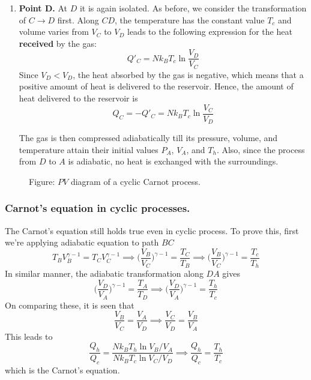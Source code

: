 \documentclass[../../../Main.tex]{subfiles}
\begin{document}
\begin{enumerate}
    \item \textbf{Point D.} At $ D$ it is again isolated. As before, we consider the transformation of $C\rightarrow D$ first. Along $CD$, the temperature has the constant value $T_c$ and volume varies from $V_C$ to $V_D$ leads to the following expression for the heat \textbf{received} by the gas:
    \begin{equation*}
        Q'_C=Nk_BT_c\ln \frac{V_D}{V_C}
    \end{equation*}
    Since $V_D < V_D$, the heat absorbed by the gas is negative, which means that a positive amount of heat is delivered to the reservoir. Hence, the amount of heat delivered to the reservoir is 
    \begin{equation*}
        Q_C=-Q'_C=Nk_BT_c\ln\frac{V_C}{V_D}
    \end{equation*}
    
    The gas is then compressed adiabatically till its pressure, volume, and temperature attain their initial values $P_A$, $V_A$, and $T_h$. Also, since the process from $D$ to $A$ is adiabatic, no heat is exchanged with the surroundings. 
\end{enumerate}

\begin{figure}
    \centering
    \caption*{Figure: $PV$ diagram of a cyclic Carnot process.}
\end{figure}

\subsubsection{Carnot's equation in cyclic processes.} The Carnot's equation still holds true even in cyclic process. To prove this, first we're applying adiabatic equation to path $BC$
\begin{equation*}
    T_BV_B^{\gamma-1}=T_CV_C^{\gamma-1}\implies \biggl(\frac{V_B}{V_C}\biggr)^{\gamma-1}=\frac{T_C}{T_B}\implies\biggl(\frac{V_B}{V_C}\biggr)^{\gamma-1}=\frac{T_c}{T_h}
\end{equation*}
In similar manner, the adiabatic transformation along $ D A$ gives
\begin{equation*}
    \biggl(\frac{V_D}{V_A}\biggr)^{\gamma-1}=\frac{T_A}{T_D}\implies \biggl(\frac{V_D}{V_A}\biggr)^{\gamma-1}=\frac{T_h}{T_c}
\end{equation*}
On comparing these, it is seen that
\begin{equation*}
    \frac{V_B}{V_C}=\frac{V_A}{V_D}\implies\frac{V_C}{V_D}=\frac{V_B}{V_A}
\end{equation*}
This leads to 
\begin{equation*}
    \frac{Q_h}{Q_c}=\frac{Nk_BT_h\ln{V_B}/{V_A}}{Nk_BT_c\ln{V_C}/{V_D}}\implies \frac{Q_h}{Q_c}=\frac{T_h}{T_c}
\end{equation*}
which is the Carnot's equation.
\end{document}
